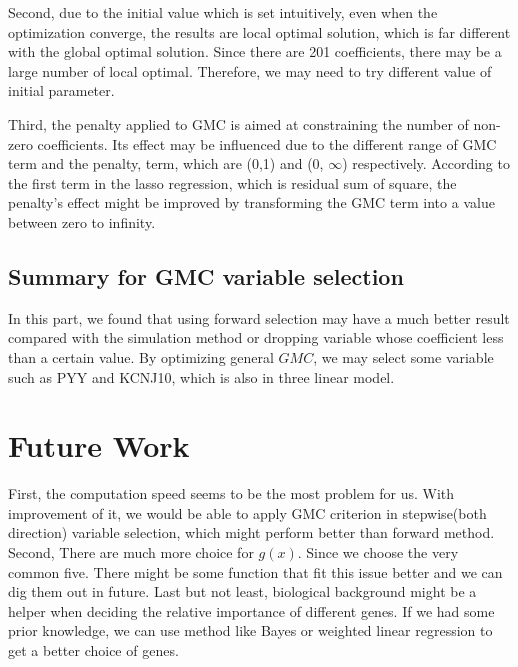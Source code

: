 \documentclass[conference,letterpaper]{IEEEtran}
\begin{document}
{Second, due to the initial value which is set intuitively, even when the optimization converge,  the results are local optimal solution, which is far different with the global optimal solution. Since there are 201 coefficients, there may be a large number of local optimal. Therefore, we may need to try different value of initial parameter.  

Third, the penalty applied to GMC is aimed at constraining the number of non-zero coefficients. Its effect may be influenced due to the different range of GMC term and the penalty, term, which are (0,1) and (0, $\infty$) respectively. According to the first term in the lasso regression, which is residual sum of square, the penalty's effect might be improved by transforming the GMC term into a value between zero to infinity. 

\subsection{{\fontsize{11}{13}\selectfont Summary for GMC variable selection}}
{\fontsize{11}{13}\selectfont In this part, we found that using forward selection may have a much better result compared with the simulation method or dropping variable whose coefficient less than a certain value. By optimizing general $GMC$, we may select some variable such as PYY and KCNJ10, which is also in three linear model. }

 
}

\section{\large Future Work}

{\fontsize{11}{13}\selectfont First, the computation speed seems to be the most problem for us. With improvement of it, we would be able to apply GMC criterion in stepwise(both direction) variable selection, which might perform better than forward method. Second, There are much more choice for $g(x)$. Since we choose the very common five. There might be some function that fit this issue better and we can dig them out in future. Last but not least, biological background might be a helper when deciding the relative importance of different genes. If we had some prior knowledge, we can use method like Bayes or weighted linear regression to get a better choice of genes.
}


\end{document}
